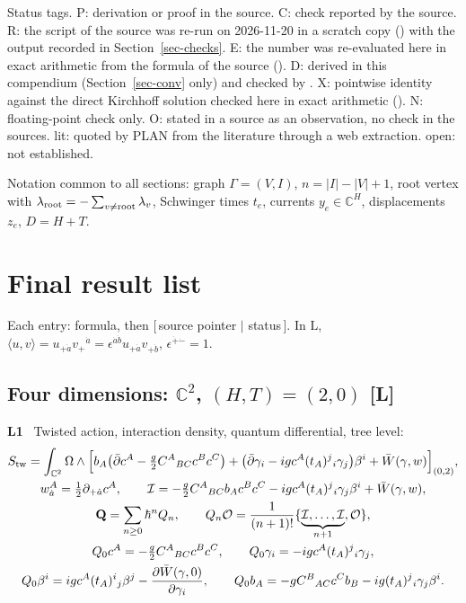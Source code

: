 \documentclass[10pt,a4paper]{article}
\numberwithin{equation}{section}
\newcommand{\cI}{\mathcal I}
\newcommand{\cO}{\mathcal O}
\newcommand{\dbar}{\bar\partial}
\newcommand{\br}[1]{\langle #1\rangle}
\newcommand{\LL}[2]{\textsf{L}(#1){\scriptsize\,\texttt{#2}}}
\newcommand{\LT}[3]{\textsf{L}\,#1\,#2{\scriptsize\,\texttt{#3}}}
\newcommand{\rid}[1]{\par\medskip\noindent\textbf{#1}\ }
\newcommand{\ptr}[2]{\par\nopagebreak{\footnotesize\raggedleft[\,#1\ $\mid$\ #2\,]\par}}
\newcommand{\st}[1]{\textsf{#1}}
\begin{document}
Status tags. \st{P}: derivation or proof in the source. \st{C}: check reported by the source. \st{R}: the script of the source was re-run on 2026-11-20 in a scratch copy () with the output recorded in Section~\ref{sec-checks}. \st{E}: the number was re-evaluated here in exact arithmetic from the formula of the source (). \st{D}: derived in this compendium (Section~\ref{sec-conv} only) and checked by . \st{X}: pointwise identity against the direct Kirchhoff solution checked here in exact arithmetic (). \st{N}: floating-point check only. \st{O}: stated in a source as an observation, no check in the sources. \st{lit}: quoted by \textsf{PLAN} from the literature through a web extraction. \st{open}: not established.

Notation common to all sections: graph $\Gamma=(V,I)$, $n=|I|-|V|+1$, root vertex with $\lambda_{\rm root}=-\sum_{v\ne{\rm root}}\lambda_v$, Schwinger times $t_e$, currents $y_e\in\mathbb C^H$, displacements $z_e$, $D=H+T$.

\section{Final result list}\label{sec-results}

Each entry: formula, then [\,source pointer $\mid$ status\,]. In \textsf{L}, $\br{u,v}=u_{+\dot a}v_+{}^{\dot a}=\epsilon^{\dot a\dot b}u_{+\dot a}v_{+\dot b}$, $\epsilon^{\dot+\dot-}=1$.

\subsection{Four dimensions: $\mathbb C^2$, $(H,T)=(2,0)$ \textsf{[L]}}

\rid{L1} Twisted action, interaction density, quantum differential, tree level:
\begin{gather*}
S_{\rm tw}=\int_{\mathbb C^2}\Omega\wedge\Big[b_A\big(\dbar c^A-\tfrac g2C^A{}_{BC}c^Bc^C\big)+\big(\dbar\gamma_i-igc^A(t_A)^j{}_i\gamma_j\big)\beta^i+\bar W(\gamma,w)\Big]_{(0,2)},\\
w^A_{\dot a}=\tfrac12\partial_{+\dot a}c^A,\qquad\cI=-\tfrac g2C^A{}_{BC}b_Ac^Bc^C-igc^A(t_A)^j{}_i\gamma_j\beta^i+\bar W(\gamma,w),\\
\mathbf Q=\sum_{n\ge0}\hbar^nQ_n,\qquad Q_n\cO=\frac1{(n+1)!}\{\underbrace{\cI,\dots,\cI}_{n+1},\cO\},\\
Q_0c^A=-\tfrac g2C^A{}_{BC}c^Bc^C,\qquad Q_0\gamma_i=-igc^A(t_A)^j{}_i\gamma_j,\\
Q_0\beta^i=igc^A(t_A)^i{}_j\beta^j-\frac{\partial\bar W(\gamma,0)}{\partial\gamma_i},\qquad
Q_0b_A=-gC^B{}_{AC}c^Cb_B-ig(t_A)^j{}_i\gamma_j\beta^i .
\end{gather*}
\ptr{\LL{2.2}{local-ch9-common-action}$=$\LL{3.13}{eq-B-8}; \LL{2.3}{eq-sum-interaction-density}$=$\LL{3.15}{eq-B-10}; \LL{2.4}{eq-sum-Q-expansion}$=$\LL{3.64}{eq-1-1}; \LL{2.5}{eq-sum-Q0-explicit}$=$\LL{3.32}{eq-B-15}}{\st{P} (\LT{Prop.}{3.2}{b-00164})}
\end{document}

